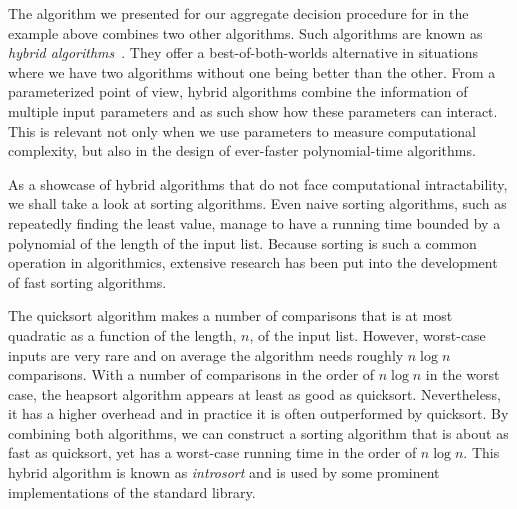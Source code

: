 The algorithm we presented for our aggregate decision procedure for  in the example above combines two other algorithms.
Such algorithms are known as \emph{hybrid algorithms}~\parencite{malek1994hybrid}.
They offer a best-of-both-worlds alternative in situations where we have two algorithms without one being better than the other.
From a parameterized point of view, hybrid algorithms combine the information of multiple input parameters and as such show how these parameters can interact.
This is relevant not only when we use parameters to measure computational complexity, but also in the design of ever-faster polynomial-time algorithms.

\begin{example}
  As a showcase of hybrid algorithms that do not face computational intractability, we shall take a look at sorting algorithms.
  Even naive sorting algorithms, such as repeatedly finding the least value, manage to have a running time bounded by a polynomial of the length of the input list.
  Because sorting is such a common operation in algorithmics, extensive research has been put into the development of fast sorting algorithms.

  The quicksort algorithm \parencite{cormen2009introduction} makes a number of comparisons that is at most quadratic as a function of the length, $n$, of the input list.
  However, worst-case inputs are very rare and on average the algorithm needs roughly $n \log n$ comparisons.
  With a number of comparisons in the order of $n \log n$ in the worst case, the heapsort algorithm \parencite{cormen2009introduction} appears at least as good as quicksort.
  Nevertheless, it has a higher overhead and in practice it is often outperformed by quicksort.
  By combining both algorithms, we can construct a sorting algorithm that is about as fast as quicksort, yet has a worst-case running time in the order of $n \log n$.
  This hybrid algorithm is known as \emph{introsort} \parencite{musser1997introspective} and is used by some prominent implementations of the \Cpp{} standard library.


\end{example}
